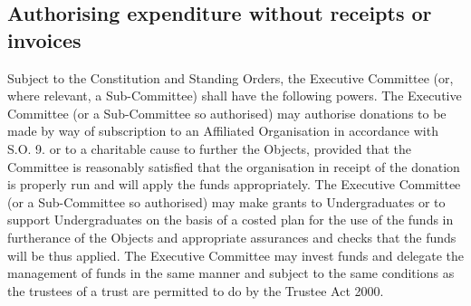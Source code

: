 \subsection{Authorising expenditure without receipts or invoices}
\npara Subject to the Constitution and Standing Orders, the Executive Committee (or, where relevant, a Sub-Committee) shall have the following powers.
\npara The Executive Committee (or a Sub-Committee so authorised) may authorise donations to be made by way of subscription to an Affiliated Organisation in accordance with S.O. 9. or to a charitable cause to further the Objects, provided that the Committee is reasonably satisfied that the organisation in receipt of the donation is properly run and will apply the funds appropriately.
\npara The Executive Committee (or a Sub-Committee so authorised) may make grants to Undergraduates or to support Undergraduates on the basis of a costed plan for the use of the funds in furtherance of the Objects and appropriate assurances and checks that the funds will be thus applied.
\npara The Executive Committee may invest funds and delegate the management of funds in the same manner and subject to the same conditions as the trustees of a trust are permitted to do by the Trustee Act 2000. 


